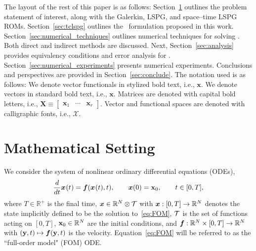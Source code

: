 \documentclass[3p,computermodern,10pt]{elsarticle}
\begin{document}
The layout of the rest of this paper is as follows: Section~\ref{sec:math} outlines the problem statement of interest, along with the Galerkin, LSPG, and space--time LSPG ROMs. Section~\ref{sec:tclspg} outlines the \methodAcronym\ formulation proposed in this work. Section~\ref{sec:numerical_techniques} outlines numerical techniques for solving \methodAcronymROMs. Both direct and indirect methods are discussed. Next, Section~\ref{sec:analysis} provides equivalency conditions and error analysis for \methodAcronymROMs. Section~\ref{sec:numerical_experiments} presents numerical experiments. Conclusions and perspectives are provided in Section~\ref{sec:conclude}.
The notation used is as follows: We denote vector functionals in stylized bold text, i.e., $\boldsymbol x$. We denote vectors in standard bold text, i.e., $\mathbf{x}$. Matrices are denoted with capital bold letters, i.e., $\mathbf{X} \equiv \begin{bmatrix} \mathbf{x}_1 & \cdots & \mathbf{x}_r\end{bmatrix}$. Vector and functional spaces are denoted with calligraphic fonts, i.e., $\mathcal{X}$.
\section{Mathematical Setting}\label{sec:math}
We consider the system of nonlinear ordinary differential equations (ODEs),
\begin{equation}\label{eq:FOM}
 \frac{d}{dt}{\boldsymbol x}^{}(t) = \boldsymbol f({\boldsymbol x}^{}(t),t), \qquad {\boldsymbol x}(0) = {{\mathbf{x}}_0}, \qquad t \in [0,T],
\end{equation}
where $T \in \mathbb{R}^+$ is the final time, ${\boldsymbol x} \in \mathbb{R}^{N} \otimes \mathcal{T} $ with ${\boldsymbol x}: [0,T] \rightarrow  \mathbb{R}^{N}$ denotes the state implicitly defined to be the solution to~\eqref{eq:FOM}, $\mathcal{T}$ is the set of functions acting on $[0,T]$, ${{\mathbf{x}}_0} \in \mathbb{R}^{N}$ are the initial conditions, and $\boldsymbol f: \mathbb{R}^{N} \times [0,T] \rightarrow \mathbb{R}^{N}$ with $(\mathbf{y},t) \mapsto \boldsymbol f(\mathbf{y},t)$ is the velocity. Equation~\eqref{eq:FOM} will be referred to as the ``full-order model" (FOM) ODE.
\end{document}
